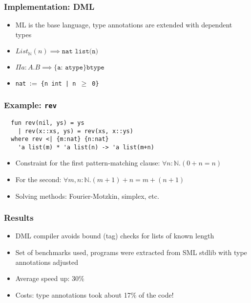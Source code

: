 \documentclass[pdf]{beamer}
\begin{document}
\begin{frame}
  \frametitle{Implementation: DML}

  \begin{itemize}
    \item ML is the base language, type annotations are extended with dependent
      types
    \item $\mathit{List_\mathbb{N}(n)} \implies \texttt{nat list(n)}$
    \item $\Pi a: A.B \implies \texttt{\{a: atype\} btype}$
    \item \texttt{nat $\vcentcolon=$ \{n int | n $\geq$ 0\}}
  \end{itemize}
\end{frame}

\begin{frame}[fragile]
  \frametitle{Example: \texttt{rev}}

  \begin{verbatim}
  fun rev(nil, ys) = ys
    | rev(x::xs, ys) = rev(xs, x::ys)
  where rev <| {m:nat} {n:nat}
    'a list(m) * 'a list(n) -> 'a list(m+n)
  \end{verbatim}

  \begin{itemize}
    \item Constraint for the first pattern-matching clause: $\forall n :
      \mathbb{N}.  (0 + n = n)$

    \item For the second: $\forall m, n : \mathbb{N}.(m + 1) + n = m + (n +
      1)$

    \item Solving methods: Fourier-Motzkin, simplex, etc.
  \end{itemize}
\end{frame}

\begin{frame}
  \frametitle{Results}

  \begin{itemize}
    \item DML compiler avoids bound (tag) checks for lists of known length
    \item Set of benchmarks used, programs were extracted from SML stdlib with
      type annotations adjusted
    \item Average speed up: 30\%
    \item Costs: type annotations took about 17\% of the code!
  \end{itemize}
\end{frame}
\end{document}
